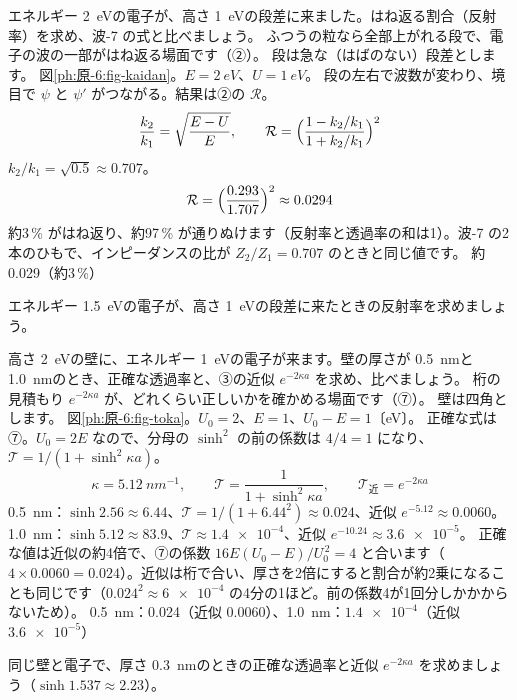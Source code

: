 \label{ph:原-6:ex2}
\begin{phreidai}[段差ではね返る電子]
エネルギー \qty{2}{eV}の電子が、高さ \qty{1}{eV}の段差に来ました。はね返る割合（反射率）を求め、波-7 の式と比べましょう。
\phbamen
ふつうの粒なら全部上がれる段で、電子の波の一部がはね返る場面です（②）。
\phmushi
段は急な（はばのない）段差とします。
\phzu
図\ref{ph:原-6:fig-kaidan}。$E=\qty{2}{eV}$、$U=\qty{1}{eV}$。
\phriyu
段の左右で波数が変わり、境目で $\psi$ と $\psi'$ がつながる。結果は②の $\mathcal R$。
\phtateru
\[\frac{k_2}{k_1}=\sqrt{\frac{E-U}{E}},\qquad \mathcal R=\Bigl(\frac{1-k_2/k_1}{1+k_2/k_1}\Bigr)^2\]
\phtoku
$k_2/k_1=\sqrt{0.5}\approx0.707$。
\[\mathcal R=\Bigl(\frac{0.293}{1.707}\Bigr)^2\approx0.0294\]
\phtashikame
約3\,\% がはね返り、約97\,\% が通りぬけます（反射率と透過率の和は1）。波-7 の2本のひもで、インピーダンスの比が $Z_2/Z_1=0.707$ のときと同じ値です。
\kotae 約0.029（約3\,\%）
\end{phreidai}
\begin{jibun}
エネルギー \qty{1.5}{eV}の電子が、高さ \qty{1}{eV}の段差に来たときの反射率を求めましょう。
\end{jibun}

\label{ph:原-6:ex3}
\begin{phreidai}[うすい壁の正確な透過率]
高さ \qty{2}{eV}の壁に、エネルギー \qty{1}{eV}の電子が来ます。壁の厚さが \qty{0.5}{nm}と \qty{1.0}{nm}のとき、正確な透過率と、③の近似 $e^{-2\kappa a}$ を求め、比べましょう。
\phbamen
桁の見積もり $e^{-2\kappa a}$ が、どれくらい正しいかを確かめる場面です（⑦）。
\phmushi
壁は四角とします。
\phzu
図\ref{ph:原-6:fig-toka}。$U_0=2$、$E=1$、$U_0-E=1$〔eV〕。
\phriyu
正確な式は⑦。$U_0=2E$ なので、分母の $\sinh^2$ の前の係数は $4/4=1$ になり、$\mathcal T=1/(1+\sinh^2\kappa a)$。
\phtateru
\[\kappa=\qty{5.12}{nm^{-1}},\qquad \mathcal T=\frac{1}{1+\sinh^2\kappa a},\qquad \mathcal T_{\text{近}}=e^{-2\kappa a}\]
\phtoku
\qty{0.5}{nm}：$\sinh2.56\approx6.44$、$\mathcal T=1/(1+6.44^2)\approx0.024$、近似 $e^{-5.12}\approx0.0060$。\\
\qty{1.0}{nm}：$\sinh5.12\approx83.9$、$\mathcal T\approx\num{1.4e-4}$、近似 $e^{-10.24}\approx\num{3.6e-5}$。
\phtashikame
正確な値は近似の約4倍で、⑦の係数 $16E(U_0-E)/U_0^{\,2}=4$ と合います（$4\times0.0060=0.024$）。近似は桁で合い、厚さを2倍にすると割合が約2乗になることも同じです（$0.024^2\approx\num{6e-4}$ の4分の1ほど。前の係数4が1回分しかかからないため）。
\kotae \qty{0.5}{nm}：0.024（近似 0.0060）、\qty{1.0}{nm}：$\num{1.4e-4}$（近似 $\num{3.6e-5}$）
\end{phreidai}
\begin{jibun}
同じ壁と電子で、厚さ \qty{0.3}{nm}のときの正確な透過率と近似 $e^{-2\kappa a}$ を求めましょう（$\sinh1.537\approx2.23$）。
\end{jibun}

